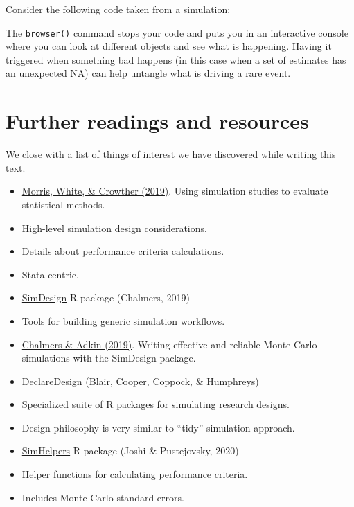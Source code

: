 \documentclass[
]{book}
\newenvironment{Shaded}{\begin{snugshade}}{\end{snugshade}}
\newcommand{\ControlFlowTok}[1]{\textcolor[rgb]{0.13,0.29,0.53}{\textbf{#1}}}
\newcommand{\FunctionTok}[1]{\textcolor[rgb]{0.13,0.29,0.53}{\textbf{#1}}}
\newcommand{\NormalTok}[1]{#1}
\newcommand{\SpecialCharTok}[1]{\textcolor[rgb]{0.81,0.36,0.00}{\textbf{#1}}}
\begin{document}
Consider the following code taken from a simulation:

\begin{Shaded}
\end{Shaded}

The \texttt{browser()} command stops your code and puts you in an interactive console where you can look at different objects and see what is happening.
Having it triggered when something bad happens (in this case when a set of estimates has an unexpected NA) can help untangle what is driving a rare event.

\chapter{Further readings and resources}\label{further-readings-and-resources}

We close with a list of things of interest we have discovered while writing this text.

\begin{itemize}
\item
  \href{https://doi.org/10.1002/sim.8086}{Morris, White, \& Crowther (2019)}. Using simulation studies to evaluate statistical methods.
\item
  High-level simulation design considerations.
\item
  Details about performance criteria calculations.
\item
  Stata-centric.
\item
  \href{https://github.com/philchalmers/SimDesign/wiki}{SimDesign} R package (Chalmers, 2019)
\item
  Tools for building generic simulation workflows.
\item
  \href{http://www.tqmp.org/RegularArticles/vol16-4/p248/}{Chalmers \& Adkin (2019)}. Writing effective and reliable Monte Carlo simulations with the SimDesign package.
\item
  \href{https://declaredesign.org/}{DeclareDesign} (Blair, Cooper, Coppock, \& Humphreys)
\item
  Specialized suite of R packages for simulating research designs.
\item
  Design philosophy is very similar to ``tidy'' simulation approach.
\item
  \href{https://meghapsimatrix.github.io/simhelpers/index.html}{SimHelpers} R package (Joshi \& Pustejovsky, 2020)
\item
  Helper functions for calculating performance criteria.
\item
  Includes Monte Carlo standard errors.
\end{itemize}

  
\end{document}
